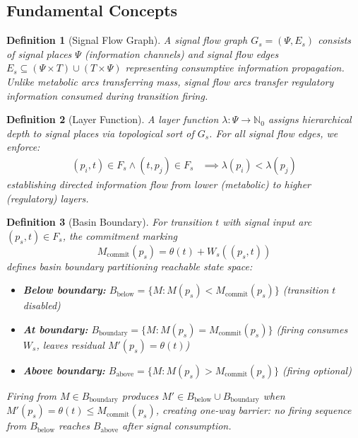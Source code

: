 \documentclass[10pt,letterpaper]{article}
\newtheorem{definition}{Definition}
\begin{document}
\subsection{Fundamental Concepts}

\begin{definition}[Signal Flow Graph]
A signal flow graph $G_s = (\Psi, E_s)$ consists of signal places $\Psi$ (information channels) and signal flow edges $E_s \subseteq (\Psi \times T) \cup (T \times \Psi)$ representing consumptive information propagation. Unlike metabolic arcs transferring mass, signal flow arcs transfer regulatory information consumed during transition firing.
\end{definition}

\begin{definition}[Layer Function]
A layer function $\lambda: \Psi \rightarrow \mathbb{N}_0$ assigns hierarchical depth to signal places via topological sort of $G_s$. For all signal flow edges, we enforce:
\begin{align*}
(p_i,t) \in F_s \wedge (t,p_j) \in F_s &\implies \lambda(p_i) < \lambda(p_j)
\end{align*}
establishing directed information flow from lower (metabolic) to higher (regulatory) layers.
\end{definition}

\begin{definition}[Basin Boundary]
For transition $t$ with signal input arc $(p_s,t) \in F_s$, the commitment marking
\begin{equation*}
M_{\text{commit}}(p_s) = \theta(t) + W_s((p_s,t))
\end{equation*}
defines basin boundary partitioning reachable state space:
\begin{itemize}
\item \textbf{Below boundary:} $B_{\text{below}} = \{M : M(p_s) < M_{\text{commit}}(p_s)\}$ (transition $t$ disabled)
\item \textbf{At boundary:} $B_{\text{boundary}} = \{M : M(p_s) = M_{\text{commit}}(p_s)\}$ (firing consumes $W_s$, leaves residual $M'(p_s) = \theta(t)$)
\item \textbf{Above boundary:} $B_{\text{above}} = \{M : M(p_s) > M_{\text{commit}}(p_s)\}$ (firing optional)
\end{itemize}
Firing from $M \in B_{\text{boundary}}$ produces $M' \in B_{\text{below}} \cup B_{\text{boundary}}$ when
$M'(p_s) = \theta(t) \leq M_{\text{commit}}(p_s)$,
creating one-way barrier: no firing sequence from $B_{\text{below}}$ reaches $B_{\text{above}}$ after signal consumption.
\end{definition}
\end{document}
